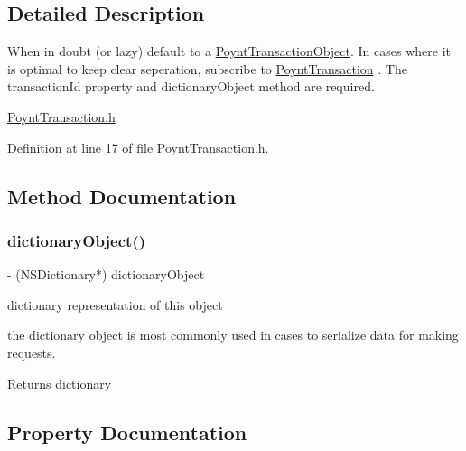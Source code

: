 \subsection{Detailed Description}
When in doubt (or lazy) default to a \hyperlink{interface_poynt_transaction_object}{Poynt\+Transaction\+Object}. In cases where it is optimal to keep clear seperation, subscribe to \hyperlink{class_poynt_transaction-p}{Poynt\+Transaction} . The transaction\+Id property and dictionary\+Object method are required. 

\hyperlink{_poynt_transaction_8h}{Poynt\+Transaction.\+h} 

Definition at line 17 of file Poynt\+Transaction.\+h.



\subsection{Method Documentation}
\hypertarget{protocol_poynt_transaction_01-p_a2482f2e9af7fe8eec4ba9710cdc963ee}{}\label{protocol_poynt_transaction_01-p_a2482f2e9af7fe8eec4ba9710cdc963ee} 
\subsubsection{\texorpdfstring{dictionary\+Object()}{dictionaryObject()}}
{\footnotesize\ttfamily -\/ (N\+S\+Dictionary$\ast$) dictionary\+Object \begin{DoxyParamCaption}{ }\end{DoxyParamCaption}}



dictionary representation of this object 

the dictionary object is most commonly used in cases to serialize data for making requests.

\begin{DoxyReturn}{Returns}
dictionary 
\end{DoxyReturn}


\subsection{Property Documentation}
\hypertarget{protocol_poynt_transaction_01-p_aacd11580c330a78310c344d78baecf8c}{}\label{protocol_poynt_transaction_01-p_aacd11580c330a78310c344d78baecf8c} 
